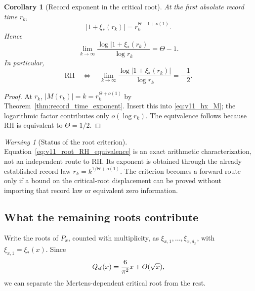 \documentclass[11pt]{amsart}
\numberwithin{equation}{section}
\theoremstyle{plain}
\newtheorem{corollary}[theorem]{Corollary}
\theoremstyle{definition}
\theoremstyle{remark}
\newtheorem{warning}[theorem]{Warning}
\begin{document}
\begin{corollary}[Record exponent in the critical root]
\label{cor:v11_root_record_theta}
At the first absolute record time \(r_k\),
\begin{equation}
\boxed{
|1+\xi_*(r_k)|=r_k^{\Theta-1+o(1)}.}
\label{eq:v11_root_record_scale}
\end{equation}
Hence
\begin{equation}
\boxed{
\lim_{k\to\infty}
\frac{\log|1+\xi_*(r_k)|}{\log r_k}
=\Theta-1.}
\label{eq:v11_root_record_theta}
\end{equation}
In particular,
\begin{equation}
\mathrm{RH}
\quad\Longleftrightarrow\quad
\lim_{k\to\infty}
\frac{\log|1+\xi_*(r_k)|}{\log r_k}
=-\frac12.
\label{eq:v11_root_RH_equivalence}
\end{equation}
\end{corollary}

\begin{proof}
At \(r_k\), \(|M(r_k)|=k=r_k^{\Theta+o(1)}\) by
Theorem~\ref{thm:record_time_exponent}.  Insert this into
\eqref{eq:v11_hx_M}; the logarithmic factor contributes only
\(o(\log r_k)\).  The equivalence follows because RH is equivalent to
\(\Theta=1/2\).
\end{proof}

\begin{warning}[Status of the root criterion]
\label{warn:v11_root_not_RH_progress}
Equation~\eqref{eq:v11_root_RH_equivalence} is an exact arithmetic
characterization, not an independent route to RH.  Its exponent is obtained
through the already established record law
\(r_k=k^{1/\Theta+o(1)}\).  The criterion becomes a forward route only if a
bound on the critical-root displacement can be proved without importing that
record law or equivalent zero information.
\end{warning}

\subsection{What the remaining roots contribute}
\label{subsec:v11_noncritical_roots}

Write the roots of \(P_x\), counted with multiplicity, as
\(\xi_{x,1},\ldots,\xi_{x,d_x}\), with
\(\xi_{x,1}=\xi_*(x)\).  Since
\begin{equation}
Q_{\rm sf}(x)
=\frac6{\pi^2}x+O(\sqrt x),
\label{eq:v11_Qsf_asymptotic}
\end{equation}
we can separate the Mertens-dependent critical root from the rest.
\end{document}

